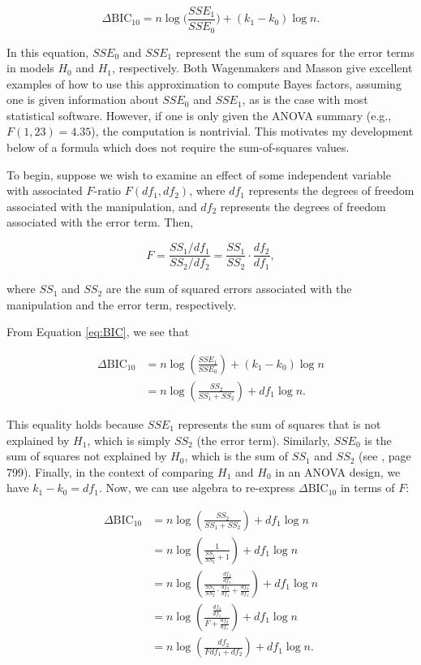 \documentclass[]{article}
\begin{document}
\begin{equation}\label{eq:BIC}
  \Delta\text{BIC}_{10} = n\log\Biggl(\frac{SSE_1}{SSE_0}\Biggr) + (k_1-k_0)\log n. 
\end{equation}

\noindent
In this equation, $SSE_0$ and $SSE_1$ represent the sum of squares for the error terms in models $H_0$ and $H_1$, respectively.  Both Wagenmakers \cite{wagenmakers2007} and Masson \cite{masson2011} give excellent examples of how to use this approximation to compute Bayes factors, assuming one is given information about $SSE_0$ and $SSE_1$, as is the case with most statistical software.  However, if one is only given the ANOVA summary (e.g., $F(1,23)=4.35$), the computation is nontrivial.  This motivates my development below of a formula which does not require the sum-of-squares values.

To begin, suppose we wish to examine an effect of some independent variable with associated $F$-ratio $F(df_1,df_2)$, where $df_1$ represents the degrees of freedom associated with the manipulation, and $df_2$ represents the degrees of freedom associated with the error term.  Then,

\[
  F = \frac{SS_1/df_1}{SS_2/df_2} = \frac{SS_1}{SS_2}\cdot \frac{df_2}{df_1},
\]

\noindent
where $SS_1$ and $SS_2$ are the sum of squared errors associated with the manipulation and the error term, respectively. 

From Equation \ref{eq:BIC}, we see that

\begin{align*}
  \Delta\text{BIC}_{10} &= n\log\left(\frac{SSE_1}{SSE_0}\right) + (k_1-k_0)\log n\\
                        & = n\log \left(\frac{SS_2}{SS_1+SS_2}\right) + df_1\log n.
\end{align*}

\noindent
This equality holds because $SSE_1$ represents the sum of squares that is not explained by $H_1$, which is simply $SS_2$ (the error term).  Similarly, $SSE_0$ is the sum of squares not explained by $H_0$, which is the sum of $SS_1$ and $SS_2$ (see \cite{wagenmakers2007}, page 799).  Finally, in the context of comparing $H_1$ and $H_0$ in an ANOVA design, we have $k_1-k_0=df_1$.  Now, we can use algebra to re-express $\Delta\text{BIC}_{10}$ in terms of $F$:

\begin{align*}
  \Delta\text{BIC}_{10} &=  n\log \left(\frac{SS_2}{SS_1+SS_2}\right) + df_1\log n\\
  &= n\log\left(\frac{1}{\frac{SS_1}{SS_2}+1}\right) + df_1\log n\\
                        &= n\log \left( \frac{\frac{df_2}{df_1}}{\frac{SS_1}{SS_2}\cdot \frac{df_2}{df_1}+\frac{df_2}{df_1}}\right) + df_1\log n\\
                        &= n\log \left(\frac{\frac{df_2}{df_1}}{F + \frac{df_2}{df_1}}\right) + df_1\log n\\
  & = n\log\left(\frac{df_2}{Fdf_1 + df_2}\right) + df_1\log n.\\
\end{align*}
\end{document}
